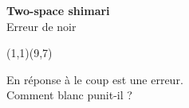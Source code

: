 \documentclass[preview, border=0pt, varwidth=false]{standalone}
\begin{document}
	\setgounit{0.6cm} 
	
\parbox[c][14.65cm][c]{10.2cm}{
	\centering
	
	{\Large\textbf{Two-space shimari} \\ Erreur de noir}
	\vspace{3em}
	
	\begin{psgopartialboard}{(1,1)(9,7)}
		\pass
	\end{psgopartialboard}
	
	\vspace{1em}
	En réponse à  le coup  est une erreur. \\ Comment blanc punit-il ?
}
\end{document}
